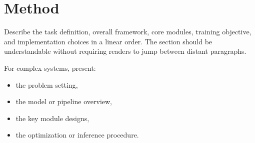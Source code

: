 \section{Method}

Describe the task definition, overall framework, core modules, training objective, and implementation choices in a linear order. The section should be understandable without requiring readers to jump between distant paragraphs.

For complex systems, present:

\begin{itemize}
  \item the problem setting,
  \item the model or pipeline overview,
  \item the key module designs,
  \item the optimization or inference procedure.
\end{itemize}
